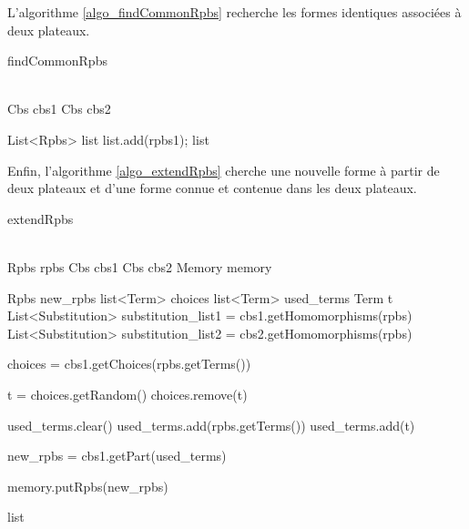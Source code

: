 L'algorithme \vref{algo_findCommonRpbs} recherche les formes identiques associées à deux plateaux.
 
\begin{algorithm}[H]
	\caption{findCommonRpbs}
	\label{algo_findCommonRpbs}
	\KwData
	{
		\\
		Cbs cbs1\;
		Cbs cbs2\;
	}	
  \vspace{0.2cm}
  
  List<Rpbs> list\;
		{
				{
					{
						list.add(rpbs1);
					}
				}
		}
		\Return list\;
\end{algorithm}

Enfin, l'algorithme \vref{algo_extendRpbs} cherche une nouvelle forme à partir de deux plateaux et d'une forme connue et contenue dans les deux plateaux.


\begin{algorithm}[H]
	\caption{extendRpbs}
	\label{algo_extendRpbs}
	\KwData
	{
	\\
		Rpbs rpbs\;
		Cbs cbs1\;
		Cbs cbs2\;
		Memory memory\;
	}	
  \vspace{0.2cm}
  
  Rpbs new\_rpbs\;
  list<Term> choices\;
  list<Term> used\_terms\;
  Term t\;
	List<Substitution> substitution\_list1 = cbs1.getHomomorphisms(rpbs)\;
  List<Substitution> substitution\_list2 = cbs2.getHomomorphisms(rpbs)\;

		{
			
			choices = cbs1.getChoices(rpbs.getTerms())\;
				{
					t = choices.getRandom()\;
					choices.remove(t)\;
					
					used\_terms.clear()\;
					used\_terms.add(rpbs.getTerms())\;
					used\_terms.add(t)\;
						
					new\_rpbs = cbs1.getPart(used\_terms)\;
						{
							{
								{
									memory.putRpbs(new\_rpbs)\;
								}
							
							}
						}
				}
		}
		\Return list\;
\end{algorithm}


